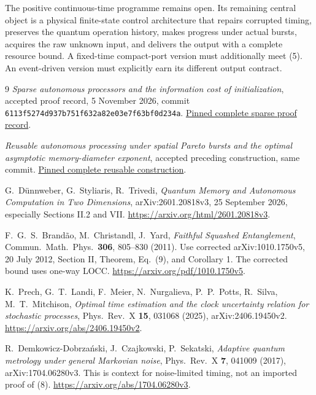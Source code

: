 \documentclass[11pt]{article}
\begin{document}
The positive continuous-time programme remains open. Its remaining
central object is a physical finite-state control architecture that
repairs corrupted timing, preserves the quantum operation history,
makes progress under actual bursts, acquires the raw unknown input,
and delivers the output with a complete resource bound. A fixed-time
compact-port version must additionally meet (5). An event-driven
version must explicitly earn its different output contract.

\begin{thebibliography}{9}
\emph{Sparse autonomous processors and the information cost of initialization},
accepted proof record, 5 November 2026, commit
\texttt{6113f5274d937b751f632a82e03e7f63bf0d234a}.
\href{https://raw.githubusercontent.com/harjassand/astra-research-knowledge/6113f5274d937b751f632a82e03e7f63bf0d234a/research/returns/2026-11-05-p2-sparse-autonomous-processor/package/report.txt}{Pinned complete sparse proof record}.

\emph{Reusable autonomous processing under spatial Pareto bursts and the
optimal asymptotic memory-diameter exponent}, accepted preceding construction,
same commit.
\href{https://raw.githubusercontent.com/harjassand/astra-research-knowledge/6113f5274d937b751f632a82e03e7f63bf0d234a/research/returns/2026-11-05-p2-sparse-autonomous-processor/package/accepted_reusable_report.tex}{Pinned complete reusable construction}.

G.~D\"unnweber, G.~Styliaris, R.~Trivedi,
\emph{Quantum Memory and Autonomous Computation in Two Dimensions},
arXiv:2601.20818v3, 25 September 2026, especially Sections II.2 and VII.
\url{https://arxiv.org/html/2601.20818v3}.

F.~G.~S.~Brand\~ao, M.~Christandl, J.~Yard,
\emph{Faithful Squashed Entanglement},
Commun.\ Math.\ Phys.\ \textbf{306}, 805--830 (2011).
Use corrected arXiv:1010.1750v5, 20 July 2012, Section II, Theorem,
Eq.\ (9), and Corollary 1. The corrected bound uses one-way LOCC.
\url{https://arxiv.org/pdf/1010.1750v5}.

K.~Prech, G.~T.~Landi, F.~Meier, N.~Nurgalieva, P.~P.~Potts,
R.~Silva, M.~T.~Mitchison,
\emph{Optimal time estimation and the clock uncertainty relation for
stochastic processes}, Phys.\ Rev.\ X \textbf{15}, 031068 (2025),
arXiv:2406.19450v2.
\url{https://arxiv.org/abs/2406.19450v2}.

R.~Demkowicz-Dobrza\'nski, J.~Czajkowski, P.~Sekatski,
\emph{Adaptive quantum metrology under general Markovian noise},
Phys.\ Rev.\ X \textbf{7}, 041009 (2017), arXiv:1704.06280v3.
This is context for noise-limited timing, not an imported proof of (8).
\url{https://arxiv.org/abs/1704.06280v3}.
\end{thebibliography}
\end{document}
